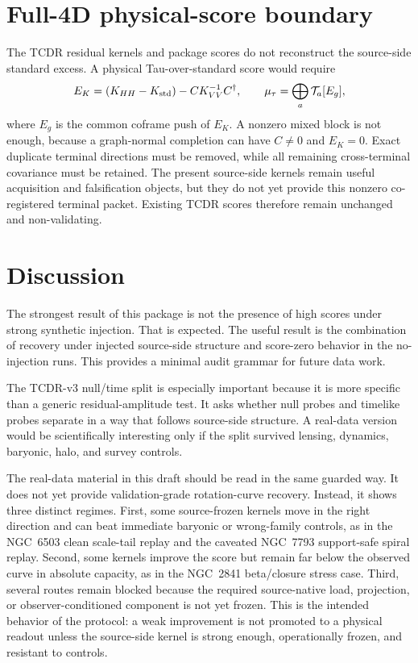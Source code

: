 \documentclass[11pt]{article}
\begin{document}
\section{Full-4D physical-score boundary}

The TCDR residual kernels and package scores do not reconstruct the source-side
standard excess.  A physical Tau-over-standard score would require
\[
 E_K=(K_{HH}-K_{\rm std})-CK_{VV}^{-1}C^\dagger,
 \qquad
 \mu_\tau=\bigoplus_a\mathcal T_a[E_g],
\]
where $E_g$ is the common coframe push of $E_K$.  A nonzero mixed block is
not enough, because a graph-normal completion can have $C\neq0$ and
$E_K=0$.  Exact duplicate terminal directions must be removed, while all
remaining cross-terminal covariance must be retained.  The present
source-side kernels remain useful acquisition and falsification objects, but
they do not yet provide this nonzero co-registered terminal packet.  Existing
TCDR scores therefore remain unchanged and non-validating.

\section{Discussion}

The strongest result of this package is not the presence of high scores under
strong synthetic injection.  That is expected.  The useful result is the
combination of recovery under injected source-side structure and score-zero
behavior in the no-injection runs.  This provides a minimal audit grammar for
future data work.

The TCDR-v3 null/time split is especially important because it is more
specific than a generic residual-amplitude test.  It asks whether null probes
and timelike probes separate in a way that follows source-side structure.  A
real-data version would be scientifically interesting only if the split
survived lensing, dynamics, baryonic, halo, and survey controls.

The real-data material in this draft should be read in the same guarded way.
It does not yet provide validation-grade rotation-curve recovery.  Instead, it
shows three distinct regimes.  First, some source-frozen kernels move in the
right direction and can beat immediate baryonic or wrong-family controls, as in
the NGC~6503 clean scale-tail replay and the caveated NGC~7793 support-safe
spiral replay.  Second, some kernels improve the score but remain far below the
observed curve in absolute capacity, as in the NGC~2841 beta/closure stress
case.  Third, several routes remain blocked because the required source-native
load, projection, or observer-conditioned component is not yet frozen.  This is
the intended behavior of the protocol: a weak improvement is not promoted to a
physical readout unless the source-side kernel is strong enough, operationally
frozen, and resistant to controls.
\end{document}
